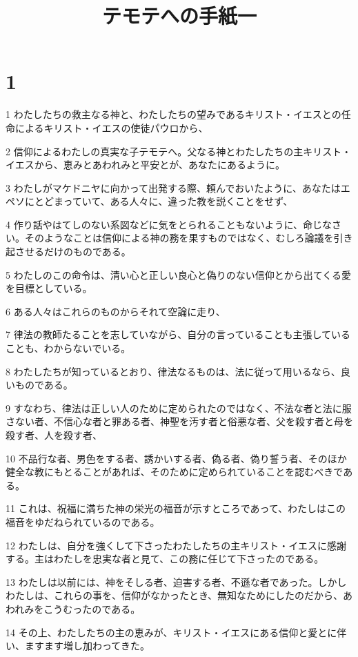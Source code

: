 

\title{テモテへの手紙一}


\chapter{1}

\par 1 わたしたちの救主なる神と、わたしたちの望みであるキリスト・イエスとの任命によるキリスト・イエスの使徒パウロから、
\par 2 信仰によるわたしの真実な子テモテへ。父なる神とわたしたちの主キリスト・イエスから、恵みとあわれみと平安とが、あなたにあるように。
\par 3 わたしがマケドニヤに向かって出発する際、頼んでおいたように、あなたはエペソにとどまっていて、ある人々に、違った教を説くことをせず、
\par 4 作り話やはてしのない系図などに気をとられることもないように、命じなさい。そのようなことは信仰による神の務を果すものではなく、むしろ論議を引き起させるだけのものである。
\par 5 わたしのこの命令は、清い心と正しい良心と偽りのない信仰とから出てくる愛を目標としている。
\par 6 ある人々はこれらのものからそれて空論に走り、
\par 7 律法の教師たることを志していながら、自分の言っていることも主張していることも、わからないでいる。
\par 8 わたしたちが知っているとおり、律法なるものは、法に従って用いるなら、良いものである。
\par 9 すなわち、律法は正しい人のために定められたのではなく、不法な者と法に服さない者、不信心な者と罪ある者、神聖を汚す者と俗悪な者、父を殺す者と母を殺す者、人を殺す者、
\par 10 不品行な者、男色をする者、誘かいする者、偽る者、偽り誓う者、そのほか健全な教にもとることがあれば、そのために定められていることを認むべきである。
\par 11 これは、祝福に満ちた神の栄光の福音が示すところであって、わたしはこの福音をゆだねられているのである。
\par 12 わたしは、自分を強くして下さったわたしたちの主キリスト・イエスに感謝する。主はわたしを忠実な者と見て、この務に任じて下さったのである。
\par 13 わたしは以前には、神をそしる者、迫害する者、不遜な者であった。しかしわたしは、これらの事を、信仰がなかったとき、無知なためにしたのだから、あわれみをこうむったのである。
\par 14 その上、わたしたちの主の恵みが、キリスト・イエスにある信仰と愛とに伴い、ますます増し加わってきた。
